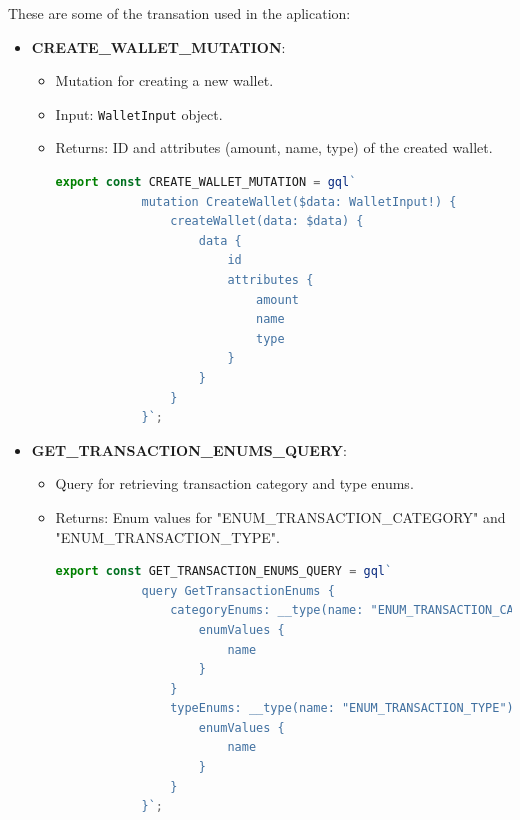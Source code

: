 These are some of the transation used in the aplication:
\newpage
\begin{itemize}
    \item \textbf{CREATE\_WALLET\_MUTATION}:
    \begin{itemize}
        \item Mutation for creating a new wallet.
        \item Input: \texttt{WalletInput} object.
        \item Returns: ID and attributes (amount, name, type) of the created wallet.
        \begin{lstlisting}[language=TypeScript]
        export const CREATE_WALLET_MUTATION = gql`
            mutation CreateWallet($data: WalletInput!) {
                createWallet(data: $data) {
                    data {
                        id
                        attributes {
                            amount
                            name
                            type
                        }
                    }
                }
            }`;
        \end{lstlisting}
    \end{itemize}
    
    \item \textbf{GET\_TRANSACTION\_ENUMS\_QUERY}:
    \begin{itemize}
        \item Query for retrieving transaction category and type enums.
        \item Returns: Enum values for "ENUM\_TRANSACTION\_CATEGORY" and "ENUM\_TRANSACTION\_TYPE".
        \begin{lstlisting}[language=TypeScript]
        export const GET_TRANSACTION_ENUMS_QUERY = gql`
            query GetTransactionEnums {
                categoryEnums: __type(name: "ENUM_TRANSACTION_CATEGORY") {
                    enumValues {
                        name
                    }
                }
                typeEnums: __type(name: "ENUM_TRANSACTION_TYPE") {
                    enumValues {
                        name
                    }
                }
            }`;
        \end{lstlisting}
    \end{itemize}
    

\end{itemize}
